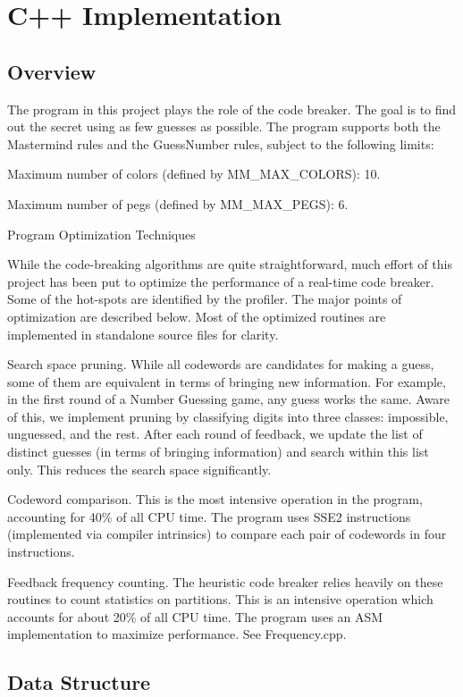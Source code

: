 \section{C++ Implementation}

\subsection{Overview}

The program in this project plays the role of the code breaker. The goal is to find out the secret using as few guesses as possible. The program supports both the Mastermind rules and the GuessNumber rules, subject to the following limits:

Maximum number of colors (defined by MM\_MAX\_COLORS): 10.

Maximum number of pegs (defined by MM\_MAX\_PEGS): 6.

Program Optimization Techniques

While the code-breaking algorithms are quite straightforward, much effort of this project has been put to optimize the performance of a real-time code breaker. Some of the hot-spots are identified by the profiler. The major points of optimization are described below. Most of the optimized routines are implemented in standalone source files for clarity.

Search space pruning. While all codewords are candidates for making a guess, some of them are equivalent in terms of bringing new information. For example, in the first round of a Number Guessing game, any guess works the same. Aware of this, we implement pruning by classifying digits into three classes: impossible, unguessed, and the rest. After each round of feedback, we update the list of distinct guesses (in terms of bringing information) and search within this list only. This reduces the search space significantly.

Codeword comparison. This is the most intensive operation in the program, accounting for 40\% of all CPU time. The program uses SSE2 instructions (implemented via compiler intrinsics) to compare each pair of codewords in four instructions.

Feedback frequency counting. The heuristic code breaker relies heavily on these routines to count statistics on partitions. This is an intensive operation which accounts for about 20\% of all CPU time. The program uses an ASM implementation to maximize performance. See Frequency.cpp.

\subsection{Data Structure}

